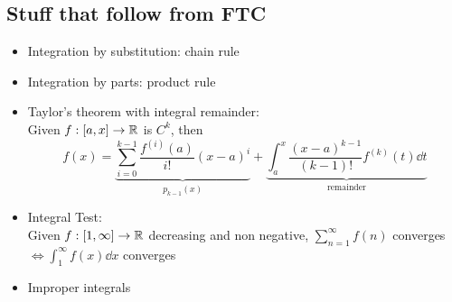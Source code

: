 \subsection*{Stuff that follow from FTC}
\begin{itemize}
      \item Integration by substitution: chain rule
      \item Integration by parts: product rule
      \item Taylor's theorem with integral remainder: \\ Given $f: [a,x] \to \mathbb{R}$ is $C^k$, then \[f(x) = \underbrace{\sum_{i=0}^{k-1}\frac{f^{(i)}(a)}{i!} (x-a)^i}_{p_{k-1}(x)} + \underbrace{\int_a^x \frac{(x-a)^{k-1}}{(k-1)!} f^{(k)}(t) \dd t }_{\text{remainder}}\]
      \item Integral Test: \\
            Given $f:[1,\infty] \to \mathbb{R}$ decreasing and non negative,
            $\sum_{n=1}^{\infty} f(n)$ converges $\iff \int_1^{\infty} f(x) \dd x$ converges
      \item Improper integrals
\end{itemize}

